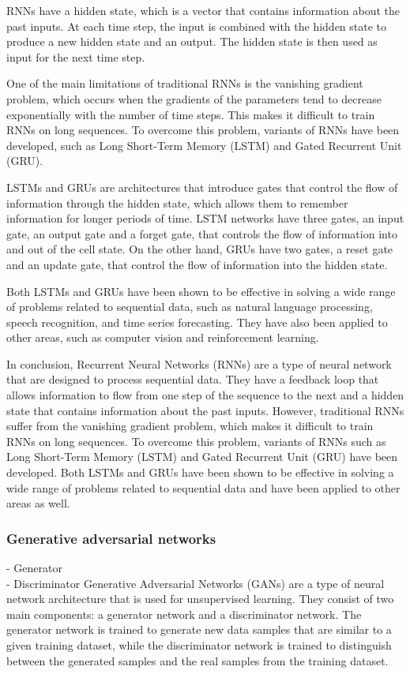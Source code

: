 RNNs have a hidden state, which is a vector that contains information about the past inputs. At each time step, the input is combined with the hidden state to produce a new hidden state and an output. The hidden state is then used as input for the next time step.

One of the main limitations of traditional RNNs is the vanishing gradient problem, which occurs when the gradients of the parameters tend to decrease exponentially with the number of time steps. This makes it difficult to train RNNs on long sequences. To overcome this problem, variants of RNNs have been developed, such as Long Short-Term Memory (LSTM) and Gated Recurrent Unit (GRU).

LSTMs and GRUs are architectures that introduce gates that control the flow of information through the hidden state, which allows them to remember information for longer periods of time. LSTM networks have three gates, an input gate, an output gate and a forget gate, that controls the flow of information into and out of the cell state. On the other hand, GRUs have two gates, a reset gate and an update gate, that control the flow of information into the hidden state.

Both LSTMs and GRUs have been shown to be effective in solving a wide range of problems related to sequential data, such as natural language processing, speech recognition, and time series forecasting. They have also been applied to other areas, such as computer vision and reinforcement learning.

In conclusion, Recurrent Neural Networks (RNNs) are a type of neural network that are designed to process sequential data. They have a feedback loop that allows information to flow from one step of the sequence to the next and a hidden state that contains information about the past inputs. However, traditional RNNs suffer from the vanishing gradient problem, which makes it difficult to train RNNs on long sequences. To overcome this problem, variants of RNNs such as Long Short-Term Memory (LSTM) and Gated Recurrent Unit (GRU) have been developed. Both LSTMs and GRUs have been shown to be effective in solving a wide range of problems related to sequential data and have been applied to other areas as well.

\subsubsection{Generative adversarial networks}
- Generator\\
- Discriminator
Generative Adversarial Networks (GANs) are a type of neural network architecture that is used for unsupervised learning. They consist of two main components: a generator network and a discriminator network. The generator network is trained to generate new data samples that are similar to a given training dataset, while the discriminator network is trained to distinguish between the generated samples and the real samples from the training dataset.

